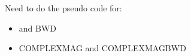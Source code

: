 Need to do the pseudo code for:
\begin{itemize}
  \item \DTCWT and \DTCWT BWD
  \item COMPLEXMAG and COMPLEXMAGBWD
\end{itemize}
